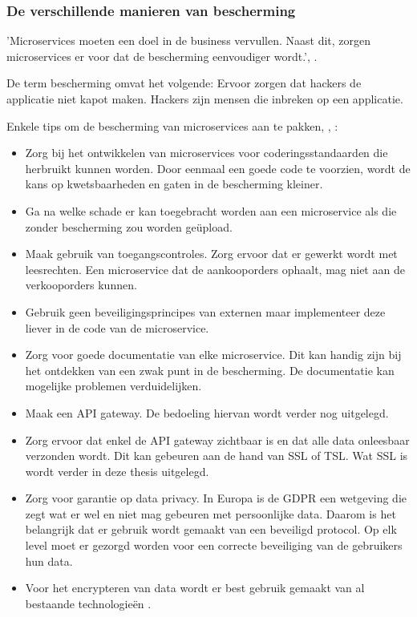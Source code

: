 \subsubsection{De verschillende manieren van bescherming}
'Microservices moeten een doel in de business vervullen. Naast dit, zorgen microservices er voor dat de bescherming eenvoudiger wordt.', \textcite{RDX2016}.

De term bescherming omvat het volgende: Ervoor zorgen dat hackers de applicatie niet kapot maken.
Hackers zijn mensen die inbreken op een applicatie.

Enkele tips om de bescherming van microservices aan te pakken, \textcite{Matteson2017}, \textcite{Silva2017}:
\begin{itemize}
	\item Zorg bij het ontwikkelen van microservices voor coderingsstandaarden die herbruikt kunnen worden. Door eenmaal een goede code te voorzien, wordt de kans op kwetsbaarheden en gaten in de bescherming kleiner.
	\item Ga na  welke schade er kan toegebracht worden aan een microservice als die zonder bescherming zou worden geüpload.
	\item Maak gebruik van toegangscontroles. Zorg ervoor dat er gewerkt wordt met leesrechten. Een microservice dat de aankooporders ophaalt, mag niet aan de verkooporders kunnen.
	\item Gebruik geen beveiligingsprincipes van externen maar implementeer deze liever in de code van de microservice.
	\item Zorg voor goede documentatie van elke microservice. Dit kan handig zijn bij het ontdekken van een zwak punt in de bescherming. De documentatie kan mogelijke problemen verduidelijken.
	\item Maak een API gateway. De bedoeling hiervan wordt verder nog uitgelegd.
	\item Zorg ervoor dat enkel de API gateway zichtbaar is en dat alle data onleesbaar verzonden wordt. Dit kan gebeuren aan de hand van SSL of TSL. Wat SSL is wordt verder in deze thesis uitgelegd. 
	\item Zorg voor garantie op data privacy. In Europa is de GDPR een  wetgeving die zegt wat er  wel en niet mag gebeuren met persoonlijke data. Daarom is het belangrijk dat er gebruik wordt gemaakt van een beveiligd protocol. Op elk level moet er gezorgd worden voor een correcte beveiliging van de gebruikers hun data. 
	\item Voor het encrypteren van data wordt er best gebruik gemaakt van al bestaande technologieën . 

\end{itemize}

